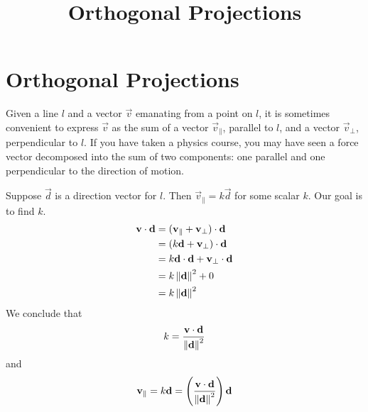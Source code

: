 \documentclass{ximera}
\title{Orthogonal Projections} \license{CC BY-NC-SA 4.0}
\begin{document}
\begin{abstract}
 \end{abstract}
\maketitle

\section*{Orthogonal Projections}

Given a line $l$ and a vector $\vec{v}$ emanating from a point on $l$, it is sometimes convenient to express $\vec{v}$ as the sum of a vector $\vec{v}_{\parallel}$, parallel to $l$, and a vector $\vec{v}_{\perp}$, perpendicular to $l$.  If you have taken a physics course, you may have seen a force vector decomposed into the sum of two components: one parallel and one perpendicular to the direction of motion.

\begin{center}

\end{center}

Suppose $\vec{d}$ is a direction vector for $l$.  Then $\vec{v}_
{\parallel}=k\vec{d}$ for some scalar $k$.  Our goal is to find $k$.  
\begin{align*}\mathbf{v}\cdot\mathbf{d}&=(\mathbf{v}_{\parallel}+\mathbf{v}_{\perp})\cdot\mathbf{d}\\
&=(k\mathbf{d}+\mathbf{v}_{\perp})\cdot\mathbf{d}\\
&=k\mathbf{d}\cdot\mathbf{d}+\mathbf{v}_{\perp}\cdot\mathbf{d}\\
&=k\left\lVert\mathbf{d}\right\rVert^2+0\\
&=k\left\lVert\mathbf{d}\right\rVert^2
\end{align*}
We conclude that $$k=\frac{\mathbf{v}\cdot\mathbf{d}}{\left\lVert\mathbf{d}\right\rVert^2}$$
and $$\mathbf{v}_{\parallel}=k\mathbf{d}=\left(\frac{\mathbf{v}\cdot\mathbf{d}}{\left\lVert\mathbf{d}\right\rVert^2}\right)\mathbf{d}$$
\end{document}
